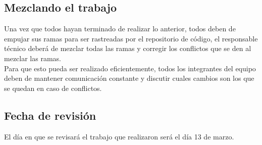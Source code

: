 \documentclass[11pt]{article}
\begin{document}
\subsection*{Mezclando el trabajo}
Una vez que todos hayan terminado de realizar lo anterior, todos deben de empujar
sus ramas para ser rastreadas por el repositorio de código, el responsable técnico
deberá de mezclar todas las ramas y corregir los conflictos que se den al mezclar
las ramas.\\
Para que esto pueda ser realizado eficientemente, todos los integrantes del equipo
deben de mantener comunicación constante y discutir cuales cambios son los que se
quedan en caso de conflictos.

\subsection*{Fecha de revisión}
El día en que se revisará el trabajo que realizaron será el día 13 de marzo.
\end{document}

